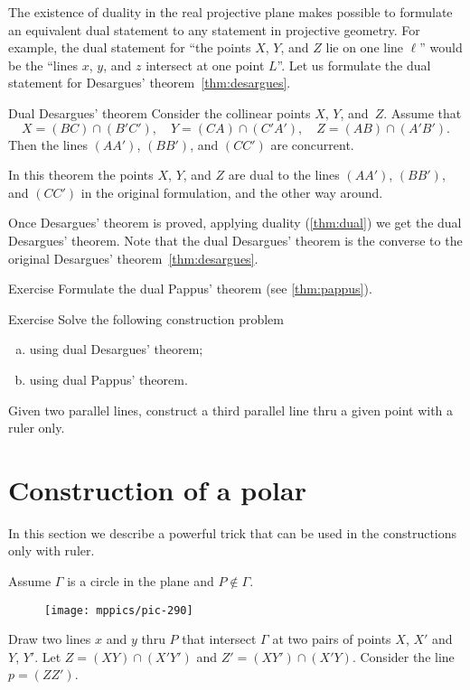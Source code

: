 The existence of duality in the real projective plane makes possible to formulate an equivalent dual statement to any statement in projective geometry.
For example, the dual statement for ``the points $X$, $Y$, and $Z$ lie on one line $\ell$''
would be the ``lines $x$, $y$, and $z$ intersect at one point $L$''.
Let us formulate the dual statement for Desargues' theorem~\ref{thm:desargues}.


\begin{thm}{Dual Desargues' theorem}\label{thm:dual-desargues}
Consider the collinear points $X$, $Y$, and~$Z$.
Assume that 
\[X=(BC)\cap (B'C'),\quad Y=(CA)\cap (C'A'),\quad Z=(AB)\cap (A'B').\]
Then the lines  $(AA')$, $(BB')$, and $(CC')$ are concurrent.
\end{thm}

In this theorem the points $X$, $Y$, and $Z$ 
are dual to the lines $(AA')$, $(BB')$, and $(CC')$ in the original formulation, and the other way around.

Once Desargues' theorem is proved, applying duality (\ref{thm:dual})
we get the dual Desargues' theorem.
Note that the dual Desargues' theorem is the converse to the original Desargues' theorem~\ref{thm:desargues}.

\begin{thm}{Exercise}\label{ex:dual-pappus}
Formulate the dual Pappus' theorem (see \ref{thm:pappus}).
\end{thm}

\begin{thm}{Exercise}\label{ex:dual-desargues-construction} 
Solve the following construction problem
\begin{enumerate}[(a)]
\item using dual Desargues' theorem;
\item using dual Pappus' theorem.
\end{enumerate}
Given two parallel lines, construct a third parallel line thru a given point with a ruler only.
\end{thm}

\section*{Construction of a polar}

In this section we describe a powerful trick that can be used in the constructions only with ruler.

Assume $\Gamma$ is a circle in the plane and $P\notin \Gamma$.
\begin{figure}[h!]
\centering
\texttt{[image: mppics/pic-290]}
\end{figure}
Draw two lines $x$ and $y$ thru $P$ that intersect $\Gamma$ at two pairs of points $X$, $X'$ and $Y$, $Y'$.
Let $Z=(XY)\cap(X'Y')$ and $Z'=(XY')\cap(X'Y)$.
Consider the line $p=(ZZ')$.

